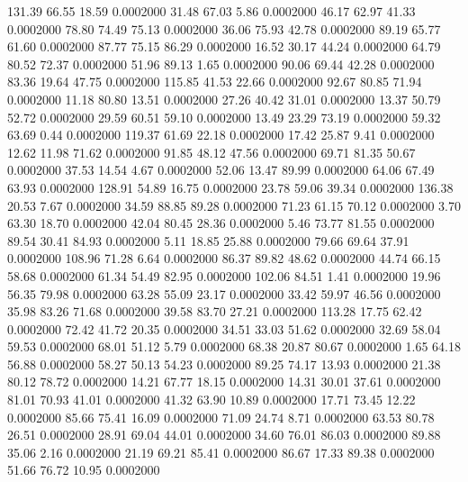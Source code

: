 131.39   66.55   18.59   0.0002000
  31.48   67.03    5.86   0.0002000
  46.17   62.97   41.33   0.0002000
  78.80   74.49   75.13   0.0002000
  36.06   75.93   42.78   0.0002000
  89.19   65.77   61.60   0.0002000
  87.77   75.15   86.29   0.0002000
  16.52   30.17   44.24   0.0002000
  64.79   80.52   72.37   0.0002000
  51.96   89.13    1.65   0.0002000
  90.06   69.44   42.28   0.0002000
  83.36   19.64   47.75   0.0002000
 115.85   41.53   22.66   0.0002000
  92.67   80.85   71.94   0.0002000
  11.18   80.80   13.51   0.0002000
  27.26   40.42   31.01   0.0002000
  13.37   50.79   52.72   0.0002000
  29.59   60.51   59.10   0.0002000
  13.49   23.29   73.19   0.0002000
  59.32   63.69    0.44   0.0002000
 119.37   61.69   22.18   0.0002000
  17.42   25.87    9.41   0.0002000
  12.62   11.98   71.62   0.0002000
  91.85   48.12   47.56   0.0002000
  69.71   81.35   50.67   0.0002000
  37.53   14.54    4.67   0.0002000
  52.06   13.47   89.99   0.0002000
  64.06   67.49   63.93   0.0002000
 128.91   54.89   16.75   0.0002000
  23.78   59.06   39.34   0.0002000
 136.38   20.53    7.67   0.0002000
  34.59   88.85   89.28   0.0002000
  71.23   61.15   70.12   0.0002000
   3.70   63.30   18.70   0.0002000
  42.04   80.45   28.36   0.0002000
   5.46   73.77   81.55   0.0002000
  89.54   30.41   84.93   0.0002000
   5.11   18.85   25.88   0.0002000
  79.66   69.64   37.91   0.0002000
 108.96   71.28    6.64   0.0002000
  86.37   89.82   48.62   0.0002000
  44.74   66.15   58.68   0.0002000
  61.34   54.49   82.95   0.0002000
 102.06   84.51    1.41   0.0002000
  19.96   56.35   79.98   0.0002000
  63.28   55.09   23.17   0.0002000
  33.42   59.97   46.56   0.0002000
  35.98   83.26   71.68   0.0002000
  39.58   83.70   27.21   0.0002000
 113.28   17.75   62.42   0.0002000
  72.42   41.72   20.35   0.0002000
  34.51   33.03   51.62   0.0002000
  32.69   58.04   59.53   0.0002000
  68.01   51.12    5.79   0.0002000
  68.38   20.87   80.67   0.0002000
   1.65   64.18   56.88   0.0002000
  58.27   50.13   54.23   0.0002000
  89.25   74.17   13.93   0.0002000
  21.38   80.12   78.72   0.0002000
  14.21   67.77   18.15   0.0002000
  14.31   30.01   37.61   0.0002000
  81.01   70.93   41.01   0.0002000
  41.32   63.90   10.89   0.0002000
  17.71   73.45   12.22   0.0002000
  85.66   75.41   16.09   0.0002000
  71.09   24.74    8.71   0.0002000
  63.53   80.78   26.51   0.0002000
  28.91   69.04   44.01   0.0002000
  34.60   76.01   86.03   0.0002000
  89.88   35.06    2.16   0.0002000
  21.19   69.21   85.41   0.0002000
  86.67   17.33   89.38   0.0002000
  51.66   76.72   10.95   0.0002000
